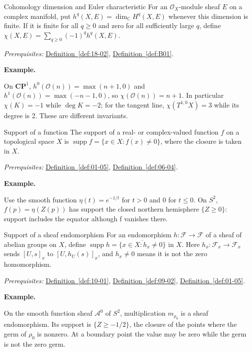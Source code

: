 \documentclass[11pt]{article}
\makeatletter
\newcommand{\C}{\mathbb C}
\newcommand{\supp}{\operatorname{supp}}
\newcounter{definition}
\newcommand{\CP}{\mathbf{CP}}
\newcommand{\exampleheading}{\par\medskip\textbf{Example.}\par\smallskip}
\newcommand{\currentdefinition}[1]{\protected@edef\@currentlabel{#1}}
\makeatother
\begin{document}
\begin{definitionbox}{Cohomology dimension and Euler characteristic}
\currentdefinition{\thedefinition}
\label{def:N22}
For an $\mathcal O_X$-module sheaf $E$ on a complex manifold, put $h^q(X,E)=\dim_{\C}H^q(X,E)$ whenever this dimension is finite. If it is finite for all $q\ge0$ and zero for all sufficiently large $q$, define $\chi(X,E)=\sum_{q\ge0}(-1)^qh^q(X,E)$.

\smallskip
\textit{Prerequisites:} \hyperref[def:18-02]{Definition~\ref*{def:18-02}}, \hyperref[def:B01]{Definition~\ref*{def:B01}}.

\exampleheading
On $\CP^1$, $h^0(\mathcal O(n))=\max(n+1,0)$ and $h^1(\mathcal O(n))=\max(-n-1,0)$, so $\chi(\mathcal O(n))=n+1$. In particular $\chi(K)=-1$ while $\deg K=-2$; for the tangent line, $\chi(T^{1,0}X)=3$ while its degree is 2. These are different invariants.
\end{definitionbox}

\begin{definitionbox}{Support of a function}
\currentdefinition{\thedefinition}
\label{def:12-04}
The support of a real- or complex-valued function $f$ on a topological space $X$ is $\supp f=\overline{\{x\in X:f(x)\ne0\}}$, where the closure is taken in $X$.

\smallskip
\textit{Prerequisites:} \hyperref[def:01-05]{Definition~\ref*{def:01-05}}, \hyperref[def:06-04]{Definition~\ref*{def:06-04}}.

\exampleheading
Use the smooth function $\eta(t)=e^{-1/t}$ for $t>0$ and 0 for $t\le0$. On $S^2$, $f(p)=\eta(Z(p))$ has support the closed northern hemisphere $\{Z\ge0\}$: support includes the equator although f vanishes there.
\end{definitionbox}

\begin{definitionbox}{Support of a sheaf endomorphism}
\currentdefinition{\thedefinition}
\label{def:12-06}
For an endomorphism $h:\mathcal F\to\mathcal F$ of a sheaf of abelian groups on $X$, define $\supp h=\overline{\{x\in X:h_x\ne0\}}$ in $X$. Here $h_x:\mathcal F_x\to\mathcal F_x$ sends $[U,s]_x$ to $[U,h_U(s)]_x$, and $h_x\ne0$ means it is not the zero homomorphism.

\smallskip
\textit{Prerequisites:} \hyperref[def:10-01]{Definition~\ref*{def:10-01}}, \hyperref[def:09-02]{Definition~\ref*{def:09-02}}, \hyperref[def:01-05]{Definition~\ref*{def:01-05}}.

\exampleheading
On the smooth function sheaf $\mathcal A^0$ of $S^2$, multiplication $m_{\rho_0}$ is a sheaf endomorphism. Its support is $\{Z\ge-1/2\}$, the closure of the points where the germ of $\rho_0$ is nonzero. At a boundary point the value may be zero while the germ is not the zero germ.
\end{definitionbox}
\end{document}
